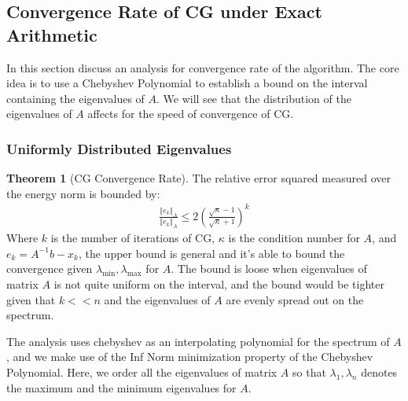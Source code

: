 \documentclass[]{article}
\theoremstyle{definition}
\newtheorem{theorem}{Theorem}            %
\begin{document}
    \subsection{Convergence Rate of CG under Exact Arithmetic}
        In this section discuss an analysis for convergence rate of the algorithm\cite{book:greenbaum}. The core idea is to use a Chebyshev Polynomial to establish a bound on the interval containing the eigenvalues of $A$. We will see that the distribution of the eigenvalues of $A$ affects for the speed of convergence of CG. 
        \subsubsection{Uniformly Distributed Eigenvalues}
            \begin{theorem}[CG Convergence Rate]\label{theorem:CG_Convergence_Rate}
                The relative error squared measured over the energy norm is bounded by: 
                \begin{align}
                    \frac{\Vert e_k\Vert_A}{\Vert e_k\Vert_A}
                    \le 2 \left(
                            \frac{\sqrt{\kappa} - 1}{\sqrt{\kappa} + 1}
                    \right)^k
                \end{align}
                Where $k$ is the number of iterations of CG, $\kappa$ is the condition number for $A$, and $e_k = A^{-1}b - x_k$, the upper bound is general and it's able to bound the convergence given $\lambda_{\min}, \lambda_{\max}$ for $A$. The bound is loose when eigenvalues of matrix $A$ is not quite uniform on the interval, and the bound would be tighter given that $k<<n$ and the eigenvalues of $A$ are evenly spread out on the spectrum. 
            \end{theorem}
            The analysis uses chebyshev as an interpolating polynomial for the spectrum of $A$, and we make use of the Inf Norm minimization property of the Chebyshev Polynomial. Here, we order all the eigenvalues of matrix $A$ so that $\lambda_1, \lambda_n$ denotes the maximum and the minimum eigenvalues for $A$. 
\end{document}

